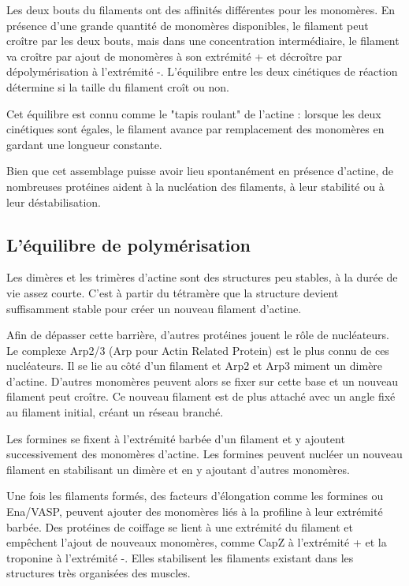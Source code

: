 \documentclass{report}
\begin{document}
Les deux bouts du filaments ont des affinités différentes pour les monomères. En présence d'une grande quantité de monomères disponibles, le filament peut croître par les deux bouts, mais dans une concentration intermédiaire, le filament va croître par ajout de monomères à son extrémité + et décroître par dépolymérisation à l'extrémité -. L'équilibre entre les deux cinétiques de réaction détermine si la taille du filament croît ou non. 

Cet équilibre est connu comme le "tapis roulant" de l'actine : lorsque les deux cinétiques sont égales, le filament avance par remplacement des monomères en gardant une longueur constante. 

Bien que cet assemblage puisse avoir lieu spontanément en présence d'actine, de nombreuses protéines aident à la nucléation des filaments, à leur stabilité ou à leur déstabilisation. 

\subsection{L'équilibre de polymérisation}

Les dimères et les trimères d'actine sont des structures peu stables, à la durée de vie assez courte. C'est à partir du tétramère que la structure devient suffisamment stable pour créer un nouveau filament d'actine. 

Afin de dépasser cette barrière, d'autres protéines jouent le rôle de nucléateurs. Le complexe Arp2/3 (Arp pour Actin Related Protein) est le plus connu de ces nucléateurs. Il se lie au côté d'un filament et Arp2 et Arp3 miment un dimère d'actine. D'autres monomères peuvent alors se fixer sur cette base et un nouveau filament peut croître. Ce nouveau filament est de plus attaché avec un angle fixé au filament initial, créant un réseau branché. 

Les formines se fixent à l'extrémité barbée d'un filament et y ajoutent successivement des monomères d'actine. Les formines peuvent nucléer un nouveau filament en stabilisant un dimère et en y ajoutant d'autres monomères. 


Une fois les filaments formés, des facteurs d'élongation comme les formines ou Ena/VASP, peuvent ajouter des monomères liés à la profiline à leur extrémité barbée.
Des protéines de coiffage se lient à une extrémité du filament et empêchent l'ajout de nouveaux monomères, comme CapZ à l'extrémité +  et la troponine à l'extrémité -. Elles stabilisent les filaments existant dans les structures très organisées des muscles. 
\end{document}
